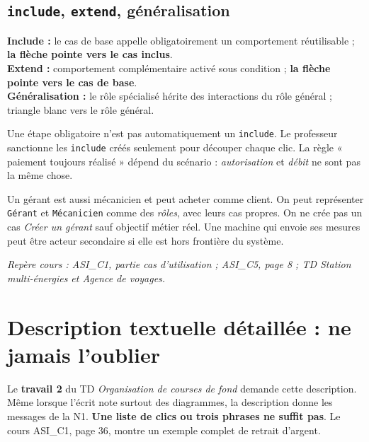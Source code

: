 \documentclass[10pt,a4paper]{article}
\newcommand{\source}[1]{\par{\footnotesize\color{bodygray}\textit{Repère cours : #1}}}
\begin{document}
\subsection{\texttt{include}, \texttt{extend}, généralisation}
\begin{center}
\end{center}
\textbf{Include :} le cas de base appelle obligatoirement un comportement réutilisable ; \textbf{la flèche pointe vers le cas inclus}.\\
\textbf{Extend :} comportement complémentaire activé sous condition ; \textbf{la flèche pointe vers le cas de base}.\\
\textbf{Généralisation :} le rôle spécialisé hérite des interactions du rôle général ; triangle blanc vers le rôle général.
\begin{warningbox}
Une étape obligatoire n'est pas automatiquement un \texttt{include}. Le professeur sanctionne les \texttt{include} créés seulement pour découper chaque clic. La règle « paiement toujours réalisé » dépend du scénario : \emph{autorisation} et \emph{débit} ne sont pas la même chose.
\end{warningbox}
\begin{exobox}
Un gérant est aussi mécanicien et peut acheter comme client. On peut représenter \texttt{Gérant} et \texttt{Mécanicien} comme des \emph{rôles}, avec leurs cas propres. On ne crée pas un cas \emph{Créer un gérant} sauf objectif métier réel. Une machine qui envoie ses mesures peut être acteur secondaire si elle est hors frontière du système.
\end{exobox}
\source{ASI\_C1, partie cas d'utilisation ; ASI\_C5, page 8 ; TD Station multi-énergies et Agence de voyages.}

\section{Description textuelle détaillée : ne jamais l'oublier}
\begin{warningbox}
Le \textbf{travail 2} du TD \emph{Organisation de courses de fond} demande cette description. Même lorsque l'écrit note surtout des diagrammes, la description donne les messages de la N1. \textbf{Une liste de clics ou trois phrases ne suffit pas}. Le cours ASI\_C1, page 36, montre un exemple complet de retrait d'argent.
\end{warningbox}
\end{document}
